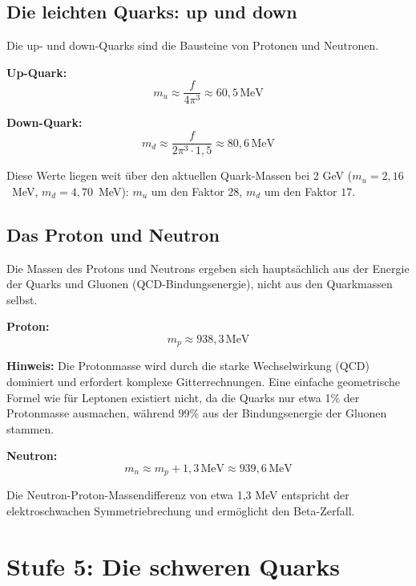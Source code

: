 	\subsection{Die leichten Quarks: up und down}
	
	Die up- und down-Quarks sind die Bausteine von Protonen und Neutronen.
	
	\textbf{Up-Quark:}
	\begin{equation}
		m_u \approx \frac{f}{4\pi^3} \approx 60{,}5\,\text{MeV}
	\end{equation}
	
	\textbf{Down-Quark:}
	\begin{equation}
		m_d \approx \frac{f}{2\pi^3 \cdot 1{,}5} \approx 80{,}6\,\text{MeV}
	\end{equation}
	
	Diese Werte liegen weit über den aktuellen Quark-Massen bei 2 GeV ($m_u = 2{,}16$~MeV, $m_d = 4{,}70$~MeV): $m_u$ um den Faktor $28$, $m_d$ um den Faktor $17$.
	
	\subsection{Das Proton und Neutron}
	
	Die Massen des Protons und Neutrons ergeben sich hauptsächlich aus der Energie der Quarks und Gluonen (QCD-Bindungsenergie), nicht aus den Quarkmassen selbst.
	
	\textbf{Proton:}
	\begin{equation}
		m_p \approx 938{,}3\,\text{MeV}
	\end{equation}
	
	\textbf{Hinweis:} Die Protonmasse wird durch die starke Wechselwirkung (QCD) dominiert und erfordert komplexe Gitterrechnungen. Eine einfache geometrische Formel wie für Leptonen existiert nicht, da die Quarks nur etwa 1\% der Protonmasse ausmachen, während 99\% aus der Bindungsenergie der Gluonen stammen.
	
	\textbf{Neutron:}
	\begin{equation}
		m_n \approx m_p + 1{,}3\,\text{MeV} \approx 939{,}6\,\text{MeV}
	\end{equation}
	
	Die Neutron-Proton-Massendifferenz von etwa 1{,}3 MeV entspricht der elektroschwachen Symmetriebrechung und ermöglicht den Beta-Zerfall.
	
	\section{Stufe 5: Die schweren Quarks}
	
